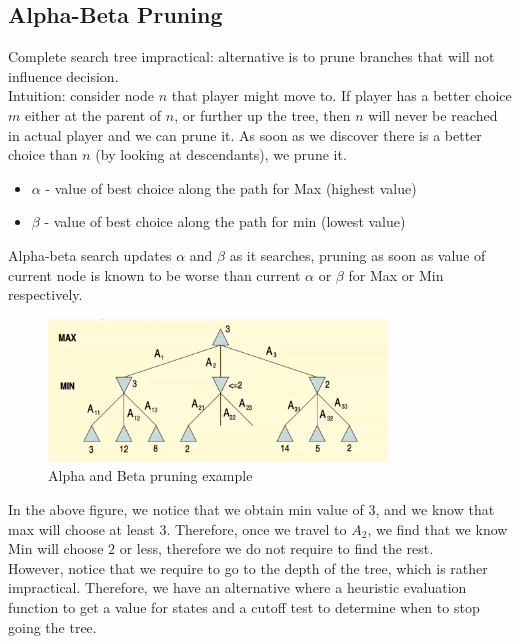 \documentclass[a4paper]{article}
\theoremstyle{plain}
\theoremstyle{definition}
\theoremstyle{remark}
\begin{document}
\subsection{Alpha-Beta Pruning}
Complete search tree impractical: alternative is to prune branches that will not influence decision. \\
Intuition: consider node $n$ that player might move to. If player has a better choice $m$ either at the parent of $n$, or further up the tree, then $n$ will never be reached in actual player and we can prune it. As soon as we discover there is a better choice than $n$ (by looking at descendants), we prune it.\\
\begin{itemize}
	\item $\alpha$ - value of best choice along the path for Max (highest value)
	\item $\beta$ - value of best choice along the path for min (lowest value)
\end{itemize}
Alpha-beta search updates $\alpha$ and $\beta$ as it searches, pruning as soon as value of current node is known to be worse than current $\alpha$ or $\beta$ for Max or Min respectively.
\begin{figure}[H]
	\centering
	\includegraphics[width=0.8\textwidth]{six.png}
	\caption{Alpha and Beta pruning example}
	\label{fig:six-png}
\end{figure}
In the above figure, we notice that we obtain min value of $3$, and we know that max will choose at least 3. Therefore, once we travel to $A_2$, we find that we know Min will choose $2$ or less, therefore we do not require to find the rest. \\
However, notice that we require to go to the depth of the tree, which is rather impractical. Therefore, we have an alternative where a heuristic evaluation function to get a value for states and a cutoff test to determine when to stop going the tree. 
\end{document}
